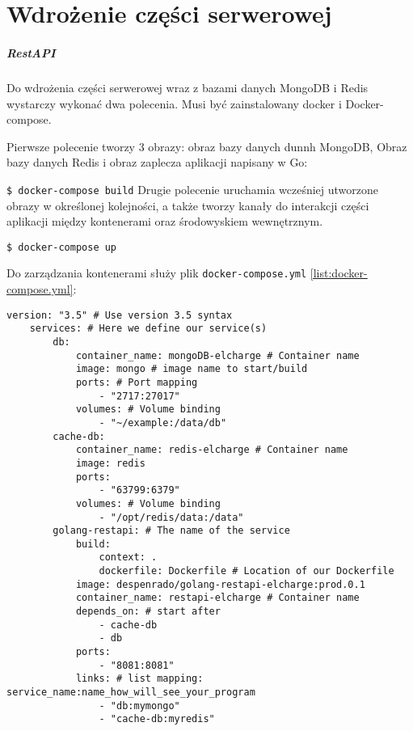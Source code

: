 \chapter{Wdrożenie części serwerowej}
\paragraph{RestAPI}

Do wdrożenia części serwerowej wraz z bazami danych MongoDB i Redis wystarczy wykonać dwa polecenia.
Musi być zainstalowany docker i Docker-compose.

Pierwsze polecenie tworzy 3 obrazy: obraz bazy danych dunnh MongoDB, Obraz bazy danych Redis i obraz zaplecza aplikacji napisany w Go:

\texttt{\$ docker-compose build}
Drugie polecenie uruchamia wcześniej utworzone obrazy w określonej kolejności, a także tworzy kanały do interakcji części aplikacji między kontenerami oraz środowyskiem wewnętrznym.

\texttt{\$ docker-compose up}

Do zarządzania kontenerami służy plik \texttt{docker-compose.yml} \ref{list:docker-compose.yml}:
\begin{lstlisting}[label=list:docker-compose.yml,caption=docker-compose.yml,basicstyle=\tiny\ttfamily]
    version: "3.5" # Use version 3.5 syntax
    services: # Here we define our service(s)
        db:
            container_name: mongoDB-elcharge # Container name
            image: mongo # image name to start/build
            ports: # Port mapping
                - "2717:27017"
            volumes: # Volume binding
                - "~/example:/data/db"
        cache-db:
            container_name: redis-elcharge # Container name
            image: redis
            ports:
                - "63799:6379"
            volumes: # Volume binding
                - "/opt/redis/data:/data"
        golang-restapi: # The name of the service
            build:
                context: .
                dockerfile: Dockerfile # Location of our Dockerfile
            image: despenrado/golang-restapi-elcharge:prod.0.1
            container_name: restapi-elcharge # Container name
            depends_on: # start after
                - cache-db
                - db
            ports:
                - "8081:8081"
            links: # list mapping: service_name:name_how_will_see_your_program
                - "db:mymongo"
                - "cache-db:myredis"
    
\end{lstlisting}

